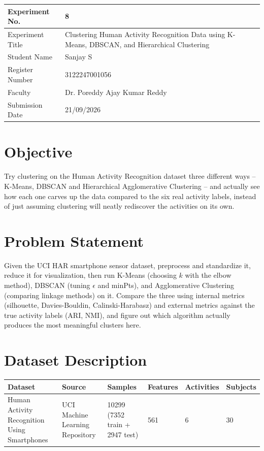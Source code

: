 \documentclass[12pt,a4paper]{article}
\begin{document}
\begin{tabular}{|p{4cm}|p{11cm}|}
\hline
Experiment No. & 8 \\ \hline
Experiment Title & Clustering Human Activity Recognition Data using K-Means, DBSCAN, and Hierarchical
Clustering\footnotemark \\ \hline
Student Name & Sanjay S \\ \hline
Register Number & 3122247001056 \\ \hline
Faculty & Dr. Poreddy Ajay Kumar Reddy \\ \hline
Submission Date & 21/09/2026 \\ \hline
\end{tabular}

\section{Objective}
Try clustering on the Human Activity Recognition dataset three different ways -- K-Means, DBSCAN and
Hierarchical Agglomerative Clustering -- and actually see how each one carves up the data compared to
the six real activity labels, instead of just assuming clustering will neatly rediscover the activities
on its own.

\section{Problem Statement}
Given the UCI HAR smartphone sensor dataset, preprocess and standardize it, reduce it for
visualization, then run K-Means (choosing $k$ with the elbow method), DBSCAN (tuning $\epsilon$ and
minPts), and Agglomerative Clustering (comparing linkage methods) on it. Compare the three using
internal metrics (silhouette, Davies-Bouldin, Calinski-Harabasz) and external metrics against the true
activity labels (ARI, NMI), and figure out which algorithm actually produces the most meaningful
clusters here.

\section{Dataset Description}
\begin{longtable}{|p{3.5cm}|p{4cm}|p{1.6cm}|p{1.8cm}|p{2cm}|p{2.2cm}|}
\hline
\textbf{Dataset} & \textbf{Source} & \textbf{Samples} & \textbf{Features} & \textbf{Activities} & \textbf{Subjects} \\ \hline
Human Activity Recognition Using Smartphones & UCI Machine Learning Repository & 10299 (7352 train +
2947 test) & 561 & 6 & 30 \\ \hline
\end{longtable}
\end{document}
